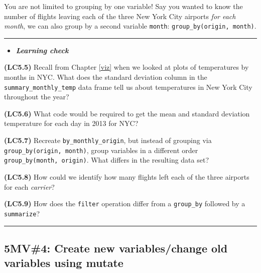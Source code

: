 \documentclass[]{tufte-book}
\newenvironment{Shaded}{\begin{snugshade}}{\end{snugshade}}
\newcommand{\KeywordTok}[1]{\textcolor[rgb]{0.13,0.29,0.53}{\textbf{{#1}}}}
\newcommand{\DataTypeTok}[1]{\textcolor[rgb]{0.13,0.29,0.53}{{#1}}}
\newcommand{\StringTok}[1]{\textcolor[rgb]{0.31,0.60,0.02}{{#1}}}
\newcommand{\NormalTok}[1]{{#1}}
\let\oldrule=\rule
\renewcommand{\rule}[1]{\oldrule{\linewidth}}
\newenvironment{rmdblock}[1]
  {\begin{shaded*}
  \begin{itemize}
  \renewcommand{\labelitemi}{
    \raisebox{-.7\height}[0pt][0pt]{
    }
  }
  \item
  }
  {
  \end{itemize}
  \end{shaded*}
  }
\newenvironment{learncheck}
  {\begin{rmdblock}{warning}}
  {\end{rmdblock}}
\theoremstyle{definition}
\theoremstyle{definition}
\theoremstyle{remark}
\begin{document}
You are not limited to grouping by one variable! Say you wanted to know
the number of flights leaving each of the three New York City airports
\emph{for each month}, we can also group by a second variable
\texttt{month}: \texttt{group\_by(origin,\ month)}.

\begin{Shaded}
\end{Shaded}

\begin{center}\rule{0.5\linewidth}{\linethickness}\end{center}

\begin{learncheck}
\textbf{\emph{Learning check}}
\end{learncheck}

\textbf{(LC5.5)} Recall from Chapter \ref{viz} when we looked at plots
of temperatures by months in NYC. What does the standard deviation
column in the \texttt{summary\_monthly\_temp} data frame tell us about
temperatures in New York City throughout the year?

\textbf{(LC5.6)} What code would be required to get the mean and
standard deviation temperature for each day in 2013 for NYC?

\textbf{(LC5.7)} Recreate \texttt{by\_monthly\_origin}, but instead of
grouping via \texttt{group\_by(origin,\ month)}, group variables in a
different order \texttt{group\_by(month,\ origin)}. What differs in the
resulting data set?

\textbf{(LC5.8)} How could we identify how many flights left each of the
three airports for each \emph{carrier}?

\textbf{(LC5.9)} How does the \texttt{filter} operation differ from a
\texttt{group\_by} followed by a \texttt{summarize}?

\begin{center}\rule{0.5\linewidth}{\linethickness}\end{center}

\subsection{5MV\#4: Create new variables/change old variables using
mutate}\label{mv4-create-new-variableschange-old-variables-using-mutate}
\end{document}
